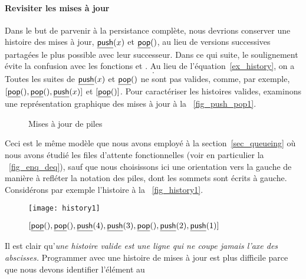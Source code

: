 \paragraph{Revisiter les mises à jour}

Dans le but de parvenir à la persistance complète, nous devrions
conserver une histoire des mises à jour, \(\underline{\textsf{push}}(x)\) et
\(\underline{\textsf{pop}}()\), au lieu de versions
successives partagées le plus possible avec leur successeur. Dans ce
qui suite, le soulignement évite la confusion avec les fonctions
 et
. Au lieu de
l'équation~\eqref{ex_history}, on a
\begin{equation}
[\ufun{push}(4), \ufun{pop}(), \ufun{push}(3), \ufun{push}(2),
\ufun{push}(1)].
\label{ex_history1}
\end{equation}
Toutes les suites de \(\underline{\textsf{push}}(x)\) et \(\underline{\textsf{pop}}()\) ne sont
pas valides, comme, par exemple, \([\underline{\textsf{pop}}(), \underline{\textsf{pop}}(),
  \underline{\textsf{push}}(x)]\) et \([\underline{\textsf{pop}}()]\). Pour caractériser les
histoires valides, examinons une représentation graphique des mises à
jour à la \fig~\vref{fig_push_pop1}.
\begin{figure}[!b]
\centering
{}
\qquad
{}
\caption{Mises à jour de piles\label{fig_push_pop1}}
\end{figure}
Ceci est le même modèle que nous avons employé à la
section~\ref{sec_queueing} où nous avons étudié les files d'attente
fonctionnelles (voir en particulier la \fig~\vref{fig_enq_deq}), sauf
que nous choisissons ici une orientation vers la gauche de manière à
refléter la notation des piles, dont les sommets sont écrits à
gauche. Considérons par exemple l'histoire à la
\fig~\vref{fig_history1}.
\begin{figure}[t]
\centering
\texttt{[image: history1]}
\caption{$[\underline{\textsf{pop}}(), \underline{\textsf{pop}}(), \underline{\textsf{push}}(4),\underline{\textsf{push}}(3),
      \underline{\textsf{pop}}(), \underline{\textsf{push}}(2), \underline{\textsf{push}}(1)]$
\label{fig_history1}}
\end{figure}
Il est clair qu'\emph{une histoire valide est une ligne qui ne coupe
  jamais l'axe des abscisses.} Programmer
 avec une histoire de mises à jour
est plus difficile parce que nous devons identifier l'élément au
